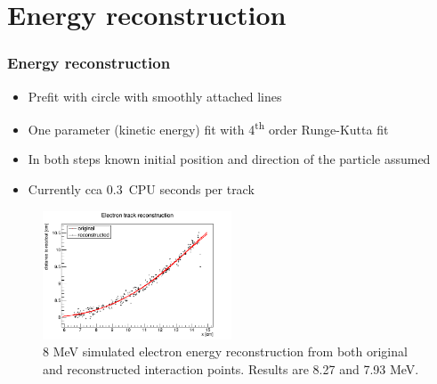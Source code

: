 \documentclass{beamer}
\begin{document}
	\section{Energy reconstruction}
	\begin{frame}
		\frametitle{Energy reconstruction}
		\begin{itemize}
			\item Prefit with circle with smoothly attached lines
			\item One parameter (kinetic energy) fit with 4\textsuperscript{th} order Runge-Kutta fit
			\item In both steps known initial position and direction of the particle assumed
			\item Currently cca 0.3~CPU seconds per track
		\end{itemize}
		\begin{figure}
			\centering
			\includegraphics[width=0.5\textwidth]{../images/reco_e.png}
			\caption{8 MeV simulated electron energy reconstruction from both original and reconstructed interaction points. Results are 8.27 and 7.93 MeV.}
		\end{figure}		
	\end{frame}
\end{document}
